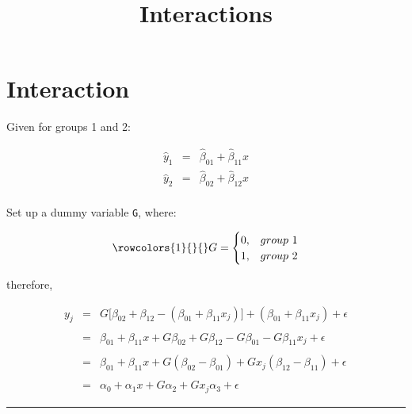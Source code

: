 \documentclass[12pt]{article}
\title{Interactions}
\author{\myname}
\date{}   %
\newcommand{\code}[1]{\texttt{#1}}                      %
\begin{document}
\maketitle


\section{Interaction}
Given for groups 1 and 2:

\begin{eqnarray*}
	\hat{y}_1 &=& \hat{\beta}_{01} + \hat{\beta}_{11} x \\
	\hat{y}_2 &=& \hat{\beta}_{02} + \hat{\beta}_{12} x \\
\end{eqnarray*}

Set up a dummy variable \code{G}, where:

\begin{equation*}
\rowcolors{1}{}{}
	G = \begin{cases}
		0, & group\ 1 \\
		1, & group\ 2
		\end{cases}
\end{equation*}

therefore,

\begin{eqnarray*}
	y_j &=& G\big[ \beta_{02} + \beta_{12} - (\beta_{01} + \beta_{11}x_j)\big] + (\beta_{01} + \beta_{11}x_j) + \epsilon \\
			&& \\
	&=& \beta_{01} + \beta_{11} x + G\beta_{02} + G\beta_{12} - G\beta_{01} - G\beta_{11}x_j + \epsilon \\
			&& \\
	&=& \beta_{01} + \beta_{11} x + G(\beta_{02} - \beta_{01}) + Gx_j(\beta_{12} - \beta_{11}) + \epsilon \\
			&& \\
	&=& \alpha_0 + \alpha_1x + G\alpha_2 + Gx_j\alpha_3 + \epsilon
\end{eqnarray*}


\def \hzline{\rule[0mm]{\textwidth}{1pt}}
\vfill \noindent \hzline \\ 
\end{document}
